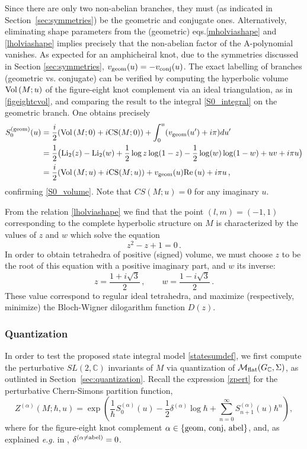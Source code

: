 \documentclass[hyper]{JHEP3}
\renewcommand{\Re}{{\rm Re}\,}
\newcommand{\C}{{\mathbb{C}}}
\newcommand{\M}{{{\cal M}}_{{\rm flat}}}
\newcommand\be{\begin{equation}}
\newcommand\ee{\end{equation}}
\newcommand{\Vol}{{\mbox{Vol\,}}}
\def\Li{\text{Li}_2}
\begin{document}
Since there are only two non-abelian branches,
they must (as indicated in Section~\ref{sec:symmetries})
be the geometric and conjugate ones.
Alternatively, eliminating shape parameters from the (geometric) eqs.\eqref{mholviashape} and \eqref{lholviashape} implies precisely that the non-abelian factor of the A-polynomial vanishes.
As expected for an amphicheiral knot, due to the symmetries discussed in Section \eqref{sec:symmetries}, $v_{{\rm geom}}(u) = -v_{{\rm conj}}(u)$. The exact labelling of branches (geometric vs. conjugate)
can be verified by computing the hyperbolic volume $\Vol (M;u)$
of the figure-eight knot complement via an ideal triangulation, as in \eqref{figeightcvol},
and comparing the result to the integral \eqref{S0_integral}
on the geometric branch. One obtains precisely
%
\begin{align} S_0^{(\rm geom)}(u) &= \frac{i}{2}(\Vol(M;0)+i{\rm CS}(M;0)) + \int_0^u (v_{\rm geom}(u')+i\pi)du' \notag \\
 &= \frac{1}{2}\big(\Li(z)-\Li(w)+\frac{1}{2}\log{z}\log(1-z)-\frac{1}{2}\log(w)\log(1-w)+uv+i\pi u\big) \notag \\
 &= \frac{i}{2}(\Vol(M;u)+i{\rm CS}(M;u))+v_{\rm geom}(u)\Re(u)+i\pi u\,, 
\end{align}
%
confirming \eqref{S0_volume}. Note that $CS(M;u)=0$ for any imaginary $u$.

{}From the relation \eqref{lholviashape} we find that the point $(l,m)=(-1,1)$
corresponding to the complete hyperbolic structure on $M$
is characterized by the values of $z$ and $w$ which solve the equation
\be
z^2 - z + 1 = 0\,.
\ee
In order to obtain tetrahedra of positive (signed) volume, we must choose $z$
to be the root of this equation with a positive imaginary part, and $w$ its inverse:
\be
z = \frac{1 + i \sqrt{3}}{2}\,,\qquad  w= \frac{1 - i \sqrt{3}}{2}\,.
\ee
These value correspond to regular ideal tetrahedra, and maximize (respectively, minimize)
the Bloch-Wigner dilogarithm function $D(z)$.



\subsubsection{Quantization}
\label{sec:figeightquant}

In order to test the proposed state integral model \eqref{statesumdef},
we first compute the perturbative
$SL(2,\C)$ invariants of $M$ via quantization of $\M (G_{\C},\Sigma)$,
as outlinted in Section~\ref{sec:quantization}.
Recall the expression \eqref{zpert} for the perturbative Chern-Simons partition function,
\be
Z^{(\alpha)} (M;\hbar,u) =
\exp\left( \frac{1}{\hbar} S_0^{(\alpha)} (u) - \frac{1}{2}\delta^{(\alpha)} \log \hbar
+ \sum_{n=0}^\infty S_{n+1}^{(\alpha)} (u) \hbar^n \right),
\ee
where for the figure-eight knot complement $\alpha \in \{{\rm geom},\,{\rm conj},\,{\rm abel}\}$,
and, as explained {\it e.g.} in \cite{gukov-2003,gukov-2006}, $\delta^{(\alpha \neq {\rm abel})} = 0$.
\end{document}
